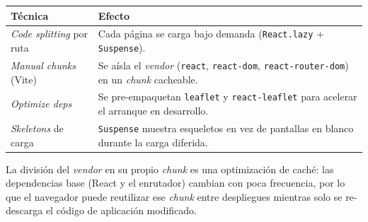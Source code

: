 \vspace{0.2cm}
\noindent
\renewcommand{\arraystretch}{1.3}
\fontsize{8.5}{10.2}\selectfont\sffamily
\begin{tabularx}{\textwidth}{|L{3.6cm}|Y|}
\hline
{}
\sffamily\textbf{Técnica} & \sffamily\textbf{Efecto} \\
\hline
\textit{Code splitting} por ruta & Cada página se carga bajo demanda (\texttt{React.lazy} + \texttt{Suspense}). \\ \hline
{}
\textit{Manual chunks} (Vite) & Se aísla el \textit{vendor} (\texttt{react}, \texttt{react-dom}, \texttt{react-router-dom}) en un \textit{chunk} cacheable. \\ \hline
\textit{Optimize deps} & Se pre-empaquetan \texttt{leaflet} y \texttt{react-leaflet} para acelerar el arranque en desarrollo. \\ \hline
{}
\textit{Skeletons} de carga & \texttt{Suspense} muestra esqueletos en vez de pantallas en blanco durante la carga diferida. \\ \hline
\end{tabularx}
\label{tab:optimizacion}

\begin{NotaTecnica}
La división del \textit{vendor} en su propio \textit{chunk} es una optimización de caché:
las dependencias base (React y el enrutador) cambian con poca frecuencia, por lo que el
navegador puede reutilizar ese \textit{chunk} entre despliegues mientras solo se
re-descarga el código de aplicación modificado.
\end{NotaTecnica}